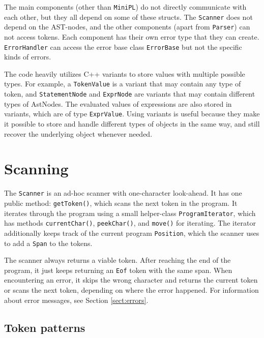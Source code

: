 \documentclass[a4paper]{article}
\newcommand*{\code}[1]{\texttt{#1}}
\begin{document}
The main components (other than \code{MiniPL}) do not directly 
communicate with each other, but they all depend on some of 
these structs. 
The \code{Scanner} does not depend on the AST-nodes, and 
the other components (apart from \code{Parser}) can not 
access tokens. Each component has their own error type that they 
can create. \code{ErrorHandler} can access the error base class 
\code{ErrorBase} but not the specific kinds of errors.

The code heavily utilizes C++ variants to store values with
multiple possible types. For example, a \code{TokenValue} is 
a variant that may contain any type of token, and
\code{StatementNode} and \code{ExprNode} are variants that 
may contain different types of AstNodes. The evaluated values 
of expressions are also stored in variants, which are of type 
\code{ExprValue}. Using variants is useful because they make 
it possible to store and handle different types of objects in 
the same way, and still recover the underlying object whenever 
needed.


\clearpage
\section{Scanning}

The \code{Scanner} is an ad-hoc scanner with one-character look-ahead.
It has one public method: \code{getToken()}, which scans the next token 
in the program.
It iterates through the program using a small helper-class 
\code{ProgramIterator}, which has methods \code{currentChar()}, 
\code{peekChar()}, and \code{move()} for iterating. The 
iterator additionally keeps track of the current program \code{Position}, 
which the scanner uses to add a \code{Span} to the tokens.

The scanner always returns a viable token. After reaching the 
end of the program, it just keeps returning an \code{Eof} token 
with the same span. When encountering an error, it skips the 
wrong character and returns the current token or scans the next token, 
depending on where the error happened. For information about 
error messages, see Section \ref{sect:errors}.

\subsection{Token patterns}
\end{document}

